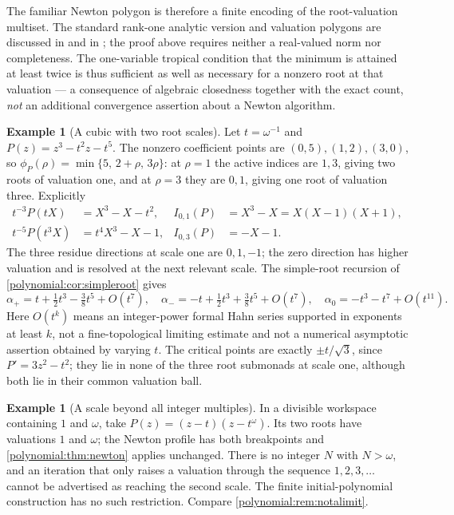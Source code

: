 \documentclass[11pt,letterpaper]{article}
\numberwithin{equation}{section}
\theoremstyle{definition}
\newtheorem{example}[theorem]{Example}
\theoremstyle{remark}\newtheorem{remark}[theorem]{Remark}
\begin{document}
The familiar Newton polygon is therefore a finite encoding of the
root-valuation multiset. The standard rank-one analytic version and valuation
polygons are discussed in \cite[\S3]{polynomial:Benedetto} and in
\cite{polynomial:ChoiLee}; the proof above requires neither a real-valued norm
nor completeness. The one-variable tropical condition that the minimum is
attained at least twice is thus sufficient as well as necessary for a nonzero
root at that valuation --- a consequence of algebraic closedness together with
the exact count, \emph{not} an additional convergence assertion about a Newton
algorithm.

\begin{example}[A cubic with two root scales]\label{polynomial:ex:newtoncubic}
Let $t=\omega^{-1}$ and $P(z)=z^3-t^2z-t^5$. The nonzero coefficient points
are $(0,5),(1,2),(3,0)$, so $\phi_P(\rho)=\min\{5,\,2+\rho,\,3\rho\}$: at
$\rho=1$ the active indices are $1,3$, giving two roots of valuation one, and
at $\rho=3$ they are $0,1$, giving one root of valuation three. Explicitly
\[
\begin{aligned}
 t^{-3}P(tX)&=X^3-X-t^2, & I_{0,1}(P)&=X^3-X=X(X-1)(X+1),\\
 t^{-5}P(t^3X)&=t^4X^3-X-1, & I_{0,3}(P)&=-X-1 .
\end{aligned}
\]
The three residue directions at scale one are $0,1,-1$; the zero direction has
higher valuation and is resolved at the next relevant scale. The simple-root
recursion of \cref{polynomial:cor:simpleroot} gives
\[
 \alpha_+=t+\tfrac12t^3-\tfrac38t^5+O(t^7),\quad
 \alpha_-=-t+\tfrac12t^3+\tfrac38t^5+O(t^7),\quad
 \alpha_0=-t^3-t^7+O(t^{11}).
\]
Here $O(t^k)$ means an integer-power formal Hahn series supported in exponents
at least $k$, not a fine-topological limiting estimate and not a numerical
asymptotic assertion obtained by varying $t$. The critical points are exactly
$\pm t/\sqrt3$, since $P'=3z^2-t^2$; they lie in none of the three root
submonads at scale one, although both lie in their common valuation ball.
\end{example}

\begin{example}[A scale beyond all integer multiples]\label{polynomial:ex:highrank}
In a divisible workspace containing $1$ and $\omega$, take
$P(z)=(z-t)(z-t^\omega)$. Its two roots have valuations $1$ and $\omega$; the
Newton profile has both breakpoints and \cref{polynomial:thm:newton} applies
unchanged. There is no integer $N$ with $N>\omega$, and an iteration that only
raises a valuation through the sequence $1,2,3,\ldots$ cannot be advertised as
reaching the second scale. The finite initial-polynomial construction has no
such restriction. Compare
\cref{polynomial:rem:notalimit}.
\end{example}
\end{document}
